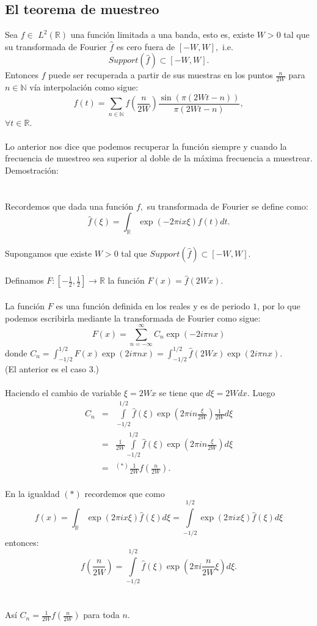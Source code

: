 \documentclass[a4paper]{article}
\begin{document}
\subsection{\sffamily El teorema de muestreo}
Sea $f\in$ $L^{2}(\mathbb{R})$ una función limitada a una banda, esto es, existe $W > 0$ tal que su transformada de Fourier $\widehat{f}$ es cero fuera de $[-W,W],$ i.e. $$
Support(\widehat{f}) \subset [-W,W].
$$
Entonces $f$ puede ser recuperada a partir de sus muestras en los puntos $\frac{n}{2W}$ para $n\in \mathbb{N}$ vía interpolación como sigue:
$$
f(t)=\sum_{n\in \mathbb{N}} f\left(\frac{n}{2W}\right)\frac{\sin(\pi(2Wt-n))}{\pi(2Wt-n)},$$ 
$\forall t\in \mathbb{R}.$\\
\\
Lo anterior nos dice que podemos recuperar la función siempre y cuando la frecuencia de muestreo sea superior al doble de la máxima frecuencia a muestrear.
\\
Demostración:\\
\\
\\
Recordemos que dada una función $f,$ su transformada de Fourier se define como:
$$
\widehat{f}(\xi)=\int_{\mathbb{R}} \exp(-2\pi ix\xi)f(t)dt.
$$
\\
Supongamos que existe $W>0$ tal que $Support(\widehat{f})\subset [-W,W].$\\
\\
Definamos $F:[-\frac{1}{2},\frac{1}{2}]\rightarrow \mathbb{R}$ la función $F(x)=\widehat{f}(2Wx).$\\
\\
La función $F$ es una función definida en los reales y es de periodo $1$, por lo que podemos escribirla mediante la transformada de Fourier como sigue: 
$$
F(x)=\sum_{n=-\infty}^{\infty}C_{n}\exp(-2i\pi nx)
$$ donde $C_{n}=\int_{-1/2}^{1/2}F(x)\exp\left(2i\pi nx\right)=\int_{-1/2}^{1/2}\widehat{f}(2Wx)\exp\left(2i\pi nx\right).$\\
(El anterior es el caso 3.)
\\
\\
Haciendo el cambio de variable $\xi=2Wx$ se tiene que $d\xi=2Wdx.$
Luego \\
\begin{eqnarray*}
	C_{n}
	&=& \int\limits_{-1/2}^{1/2} \widehat{f}(\xi)\exp\left(2\pi in\frac{\xi}{2W}\right)\frac{1}{2W}d\xi \\
	&=& \frac{1}{2W}\int\limits_{-1/2}^{1/2} \widehat{f}(\xi)\exp\left(2\pi in\frac{\xi}{2W}\right)d\xi \\
    &=& ^{(*)} \frac{1}{2W}f\left(\frac{n}{2W}\right).
\end{eqnarray*}
\\
En la igualdad $(*)$ recordemos que como \\
$$f(x)=\int_{\mathbb{R}}\exp(2\pi ix\xi)\widehat{f}(\xi)d\xi=\int\limits_{-1/2}^{1/2} \exp\left(2\pi ix\xi\right)\widehat{f}(\xi)d\xi$$ entonces: \\
$$f\left(\frac{n}{2W}\right)=\int\limits_{-1/2}^{1/2} \widehat{f}(\xi)\exp\left(2\pi i\frac{n}{2W} \xi\right)d\xi.$$\\
\\
Así $
C_{n}=\frac{1}{2W}f\left(\frac{n}{2W}\right)
$ para toda $n.$\\
\end{document}
